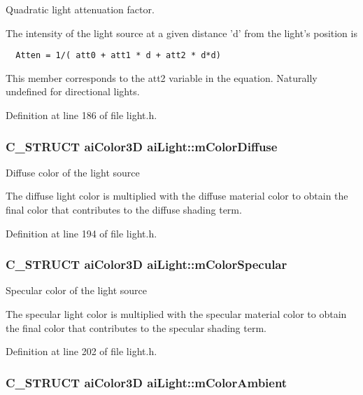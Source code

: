 Quadratic light attenuation factor.

The intensity of the light source at a given distance 'd' from the light's position is 

\begin{Code}\begin{verbatim}  Atten = 1/( att0 + att1 * d + att2 * d*d)
\end{verbatim}
\end{Code}

 This member corresponds to the att2 variable in the equation. Naturally undefined for directional lights. 

Definition at line 186 of file light.h.\hypertarget{structai_light_22e7feebbfaf53adf73bd9f581636efd}{
\subsubsection[mColorDiffuse]{\setlength{\rightskip}{0pt plus 5cm}C\_\-STRUCT {\bf aiColor3D} {\bf aiLight::mColorDiffuse}}}
\label{structai_light_22e7feebbfaf53adf73bd9f581636efd}


Diffuse color of the light source

The diffuse light color is multiplied with the diffuse material color to obtain the final color that contributes to the diffuse shading term. 

Definition at line 194 of file light.h.\hypertarget{structai_light_a79ae6ad6a10f0cb9c740e23b6bb01bf}{
\subsubsection[mColorSpecular]{\setlength{\rightskip}{0pt plus 5cm}C\_\-STRUCT {\bf aiColor3D} {\bf aiLight::mColorSpecular}}}
\label{structai_light_a79ae6ad6a10f0cb9c740e23b6bb01bf}


Specular color of the light source

The specular light color is multiplied with the specular material color to obtain the final color that contributes to the specular shading term. 

Definition at line 202 of file light.h.\hypertarget{structai_light_5188b60e6fbaf1635fa780913508e3cd}{
\subsubsection[mColorAmbient]{\setlength{\rightskip}{0pt plus 5cm}C\_\-STRUCT {\bf aiColor3D} {\bf aiLight::mColorAmbient}}}
\label{structai_light_5188b60e6fbaf1635fa780913508e3cd}


